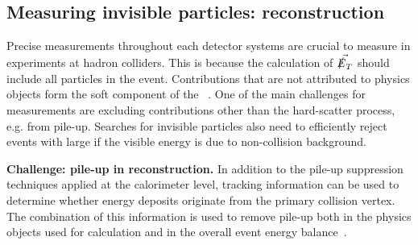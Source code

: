\begin{textbox}[!h]
\section{Measuring invisible particles: \MET reconstruction}

Precise measurements throughout each detector systems are crucial to measure \MET in experiments at hadron colliders. This is because the calculation of $\vec{\slashed{E}_T}$ should include all particles in the event.
Contributions that are not attributed to physics objects form the soft component of the \MET~\cite{Aad:2016nrq,CMS-PAS-JME-16-004}. 
One of the main challenges for \MET measurements are excluding contributions other than the hard-scatter process, e.g. from pile-up. 
Searches for invisible particles also need to efficiently reject events with large \MET if the visible energy is due to non-collision background. 

\textbf{Challenge: pile-up in \MET reconstruction.} 
In addition to the pile-up suppression techniques applied at the calorimeter level, tracking information can be used to determine whether energy deposits originate from the primary collision vertex. 
The combination of this information is used to remove pile-up both in the physics objects used for \MET calculation and in the overall event energy balance~\cite{CMS-PAS-JME-16-004,ATLAS-CONF-2014-019}. 



\end{textbox}
